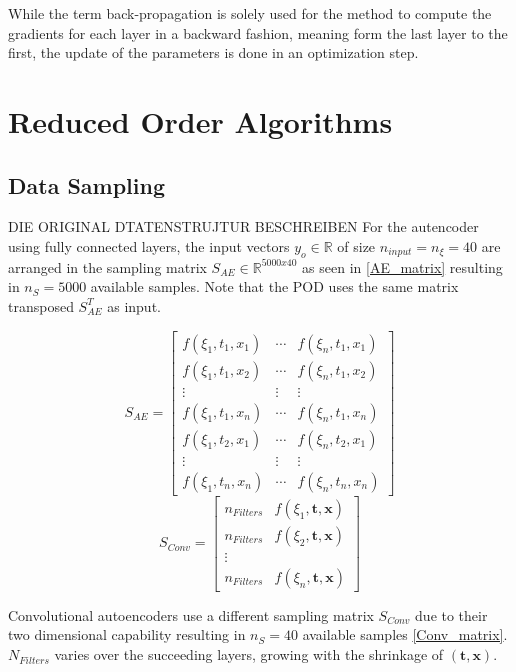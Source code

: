 \documentclass[12pt, a4paper]{article}
\begin{document}
While the term back-propagation is solely used for the method to compute the gradients for each layer in a backward fashion, meaning form the last layer to the first, the update of the parameters is done in an optimization step.
\section{Reduced Order Algorithms}
\subsection{Data Sampling}
DIE ORIGINAL DTATENSTRUJTUR BESCHREIBEN
For the autencoder using fully connected layers, the input vectors $y_o \in \mathbb{R}$ of size $n_{input} = n_{\xi} = 40$ are arranged in the sampling matrix $S_{AE} \in \mathbb{R}^{5000x40}$ as seen in \cref{AE_matrix} resulting in $n_S = 5000$ available samples. Note that the POD uses the same matrix transposed $S_{AE}^T$ as input.
\begin{multicols}{2}
	\begin{equation}
	S_{AE} = \begin{bmatrix}
	f(\xi_1,t_1,x_1)&\cdots &f(\xi_n,t_1,x_1) \\
	f(\xi_1,t_1,x_2)&\cdots &f(\xi_n,t_1,x_2) \\
	\vdots& \vdots & \vdots\\
	f(\xi_1,t_1,x_n)&\cdots &f(\xi_n,t_1,x_n)\\
	f(\xi_1,t_2,x_1)&\cdots &f(\xi_n,t_2,x_1)\\
	\vdots & \vdots & \vdots\\
	f(\xi_1,t_n,x_n)&\cdots &f(\xi_n,t_n,x_n)
	\end{bmatrix}
	\label{AE_matrix}
	\end{equation}\break
	\begin{equation}
	S_{Conv}= \begin{bmatrix}
	n_{Filters}&f(\xi_1,\textbf{t},\textbf{x})\\
	n_{Filters}&f(\xi_2,\textbf{t},\textbf{x})\\
	\vdots\\
	n_{Filters}&f(\xi_n,\textbf{t},\textbf{x})
	\end{bmatrix}
	\label{Conv_matrix}
	\end{equation}
\end{multicols}\noindent
Convolutional autoencoders use a different sampling matrix $S_{Conv}$ due to their two dimensional capability resulting in $n_S = 40$ available samples \cref{Conv_matrix}.$N_{Filters}$ varies over the succeeding layers, growing with the shrinkage of $(\textbf{t},\textbf{x})$.
\end{document}
